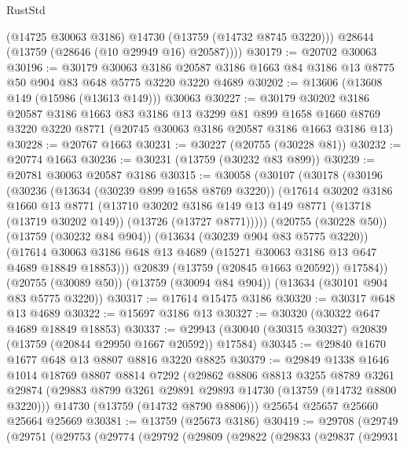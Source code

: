 \begin{lexlean}{RustStd}
\begin{coremodule}
          (@14725 @30063 @3186)
          @14730
          (@13759 (@14732 @8745 @3220)))
        @28644
        (@13759 (@28646 (@10 @29949 @16) @20587))))
@30179 := @20702 @30063
@30196 := @30179
    @30063
    @3186
    @20587
    @3186
    @1663
    @84
    @3186
    @13
    @8775
    @50
    @904
    @83
    @648
    @5775
    @3220
    @3220
    @4689
@30202 := @13606 (@13608 @149 (@15986 (@13613 @149))) @30063
@30227 := @30179
    @30202
    @3186
    @20587
    @3186
    @1663
    @83
    @3186
    @13
    @3299
    @81
    @899
    @1658
    @1660
    @8769
    @3220
    @3220
    @8771
    (@20745 @30063 @3186 @20587 @3186 @1663 @3186 @13)
@30228 := @20767 @1663
@30231 := @30227 (@20755 (@30228 @81))
@30232 := @20774 @1663
@30236 := @30231 (@13759 (@30232 @83 @899))
@30239 := @20781 @30063 @20587 @3186
@30315 := @30058
    (@30107
      (@30178
        (@30196
          (@30236
            (@13634 (@30239 @899 @1658 @8769 @3220))
            (@17614
              @30202
              @3186
              @1660
              @13
              @8771
              (@13710
                @30202
                @3186
                @149
                @13
                @149
                @8771
                (@13718 (@13719 @30202 @149))
                (@13726 (@13727 @8771)))))
          (@20755 (@30228 @50))
          (@13759 (@30232 @84 @904))
          (@13634 (@30239 @904 @83 @5775 @3220))
          (@17614 @30063 @3186 @648 @13 @4689 (@15271 @30063 @3186 @13 @647 @4689 @18849 @18853)))
        @20839
        (@13759 (@20845 @1663 @20592))
        @17584))
    (@20755 (@30089 @50))
    (@13759 (@30094 @84 @904))
    (@13634 (@30101 @904 @83 @5775 @3220))
@30317 := @17614 @15475 @3186
@30320 := @30317 @648 @13 @4689
@30322 := @15697 @3186 @13
@30327 := @30320 (@30322 @647 @4689 @18849 @18853)
@30337 := @29943 (@30040 (@30315 @30327) @20839 (@13759 (@20844 @29950 @1667 @20592)) @17584)
@30345 := @29840 @1670 @1677 @648 @13 @8807 @8816 @3220 @8825
@30379 := @29849
    @1338
    @1646
    @1014
    @18769
    @8807
    @8814
    @7292
    (@29862
      @8806
      @8813
      @3255
      @8789
      @3261
      @29874
      (@29883 @8799 @3261 @29891 @29893 @14730 (@13759 (@14732 @8800 @3220)))
      @14730
      (@13759 (@14732 @8790 @8806)))
    @25654
    @25657
    @25660
    @25664
    @25669
@30381 := @13759 (@25673 @3186)
@30419 := @29708
    (@29749
      (@29751
        (@29753
          (@29774
            (@29792
              (@29809
                (@29822
                  (@29833
                    (@29837
                      (@29931

\end{coremodule}
\end{lexlean}
